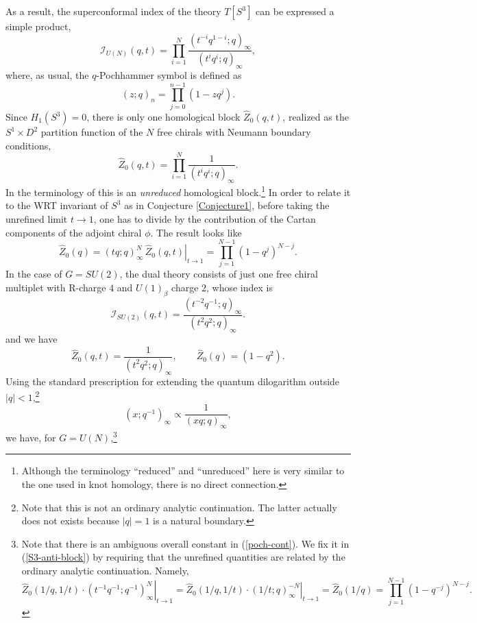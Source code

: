 \documentclass[hyper,letterpaper]{JHEP3}
\renewcommand{\hat}{\widehat}
\def\CI{{\mathcal I}}
\begin{document}
As a result, the superconformal index of the theory $T[S^3]$ can be expressed a simple product, 	
\begin{equation}
	{\CI}_{U(N)}(q,t)=\prod_{i=1}^N\frac{(t^{-i}q^{1-i};q)_\infty}{(t^iq^i;q)_\infty},
	\label{Index-UN-free}
\end{equation}
where, as usual, the $q$-Pochhammer symbol is defined as
\begin{equation}
 (z; q)_n = \prod_{j=0}^{n-1} (1-z q^j).
\end{equation}
Since $H_1(S^3)=0$, there is only one homological block $\hat{Z}_0(q,t)$, realized as the $S^1\times D^2$ partition function of the $N$ free chirals with Neumann boundary conditions,
\begin{equation}
	\hat{Z}_0(q,t)=\prod_{i=1}^N\frac{1}{(t^iq^i;q)_\infty}.
\end{equation}
In the terminology of \cite{Gukov:2016gkn} this is an \textit{unreduced} homological block.\footnote{Although the terminology
``reduced'' and ``unreduced'' here is very similar to the one used in knot homology, there is no direct connection.}
In order to relate it to the WRT invariant of $S^3$ as in Conjecture \ref{Conjecture1}, before taking the unrefined limit $t\rightarrow 1$, one has to divide by the contribution of the Cartan components of the adjoint chiral $\phi$. The result looks like
\begin{equation}
 \hat{Z}_0(q)=\left.{(tq;q)^N_\infty}\,\hat{Z}_0(q,t)\right|_{t\rightarrow 1}=
\prod_{j=1}^{N-1}(1-q^j)^{N-j}.
\end{equation}
In the case of $G=SU(2)$, the dual theory consists of just one free chiral multiplet with R-charge $4$ and $U(1)_{\beta}$ charge $2$, whose index is
\begin{equation}
	\CI_{SU(2)}(q,t)=\frac{(t^{-2}q^{-1};q)_\infty}{(t^2q^2;q)_\infty}.
\end{equation}
and we have
\begin{equation}
	\hat{Z}_0(q,t)=\frac{1}{(t^2q^2;q)_\infty},\qquad \hat{Z}_0(q)=(1-q^2).
\end{equation}
Using the standard prescription for extending the quantum dilogarithm outside $|q|<1$,\footnote{Note that this is not an ordinary analytic continuation. The latter actually does not exists because $|q|=1$ is a natural boundary.}
\begin{equation}
	(x;q^{-1})_\infty\propto \frac{1}{(xq;q)_\infty},
	\label{poch-cont}
\end{equation}
we have, for $G=U(N)$,\footnote{Note that there is an ambiguous overall constant in (\ref{poch-cont}). We fix it in (\ref{S3-anti-block}) by requiring that the unrefined quantities are related by the ordinary analytic continuation. Namely,
\begin{equation}
 \left.\hat Z_0(1/q,1/t)\cdot(t^{-1}q^{-1};q^{-1})^N_\infty\right|_{t\rightarrow 1}=
\left.\hat Z_0(1/q,1/t)\cdot(1/t;q)^{-N}_\infty\right|_{t\rightarrow 1}=
\hat{Z}_0(1/q)=\prod_{j=1}^{N-1}(1-q^{-j})^{N-j}.
\end{equation}
}
\end{document}
